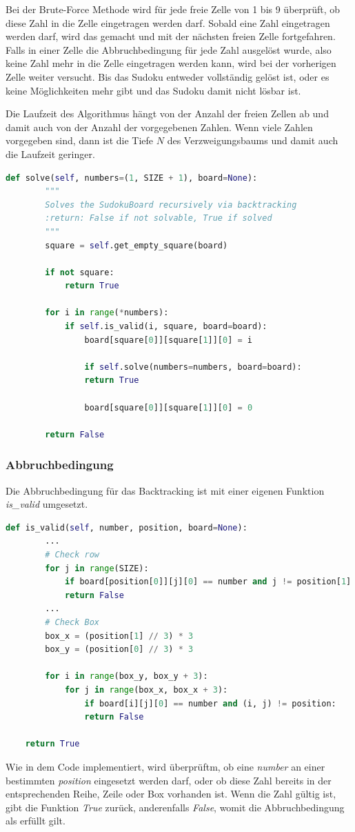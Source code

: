 Bei der Brute-Force Methode wird für jede freie Zelle von 1 bis 9 überprüft, ob diese Zahl in die Zelle eingetragen werden darf. Sobald eine Zahl eingetragen werden darf, wird das gemacht und mit der nächsten freien Zelle fortgefahren. Falls in einer Zelle die Abbruchbedingung für jede Zahl ausgelöst wurde, also keine Zahl mehr in die Zelle eingetragen werden kann, wird bei der vorherigen Zelle weiter versucht. Bis das Sudoku entweder vollständig gelöst ist, oder es keine Möglichkeiten mehr gibt und das Sudoku damit nicht lösbar ist.

Die Laufzeit des Algorithmus hängt von der Anzahl der freien Zellen ab und damit auch von der Anzahl der vorgegebenen Zahlen. Wenn viele Zahlen vorgegeben sind, dann ist die Tiefe $N$ des Verzweigungsbaums und damit auch die Laufzeit geringer. 



\begin{lstlisting}[language=Python, caption={Funktion zum Lösen des Sudokurätsel}, label={lst:solve}]
	def solve(self, numbers=(1, SIZE + 1), board=None):
		"""
		Solves the SudokuBoard recursively via backtracking
		:return: False if not solvable, True if solved
		"""
		square = self.get_empty_square(board)
		
		if not square:
			return True
		
		for i in range(*numbers):
			if self.is_valid(i, square, board=board):
				board[square[0]][square[1]][0] = i
		
				if self.solve(numbers=numbers, board=board):
				return True
		
				board[square[0]][square[1]][0] = 0
		
		return False
\end{lstlisting}

\subsubsection{Abbruchbedingung}
Die Abbruchbedingung für das Backtracking ist mit einer eigenen Funktion \textit{is\_valid} umgesetzt.
\begin{lstlisting}[language=Python, caption={Abbruchbedingung durch Validierung der Lösungsvariante}, label={lst:valid}]
	def is_valid(self, number, position, board=None):
		...
		# Check row
		for j in range(SIZE):
			if board[position[0]][j][0] == number and j != position[1]:
			return False
		...
		# Check Box
		box_x = (position[1] // 3) * 3
		box_y = (position[0] // 3) * 3
		
		for i in range(box_y, box_y + 3):
			for j in range(box_x, box_x + 3):
				if board[i][j][0] == number and (i, j) != position:
				return False
		
	return True
\end{lstlisting}
Wie in dem Code implementiert, wird überprüftm, ob eine \textit{number} an einer bestimmten \textit{position} eingesetzt werden darf, oder ob diese Zahl bereits in der entsprechenden Reihe, Zeile oder Box vorhanden ist. Wenn die Zahl gültig ist, gibt die Funktion \textit{True} zurück, anderenfalls \textit{False}, womit die Abbruchbedingung als erfüllt gilt. \cite{knott_2017} 

